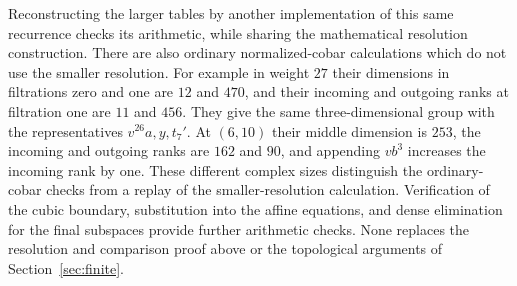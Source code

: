 \begin{remark}
Reconstructing the larger tables by another implementation of this
same recurrence checks its arithmetic, while sharing the mathematical
resolution construction.  There are also ordinary normalized-cobar
calculations which do not use the smaller resolution.  For example
in weight $27$ their dimensions in filtrations zero and one are $12$
and $470$, and their incoming and outgoing ranks at filtration one
are $11$ and $456$.  They give the same three-dimensional group with
the representatives $v^{26}a,y,t_7'$.  At $(6,10)$ their middle
dimension is $253$, the incoming and outgoing ranks are $162$ and
$90$, and appending $vb^3$ increases the incoming rank by one.
These different complex sizes distinguish the ordinary-cobar checks
from a replay of the smaller-resolution calculation.  Verification of
the cubic boundary, substitution into the affine equations, and dense
elimination for the final subspaces provide further arithmetic
checks.  None replaces the resolution and comparison proof above or
the topological arguments of Section~\ref{sec:finite}.
\end{remark}
